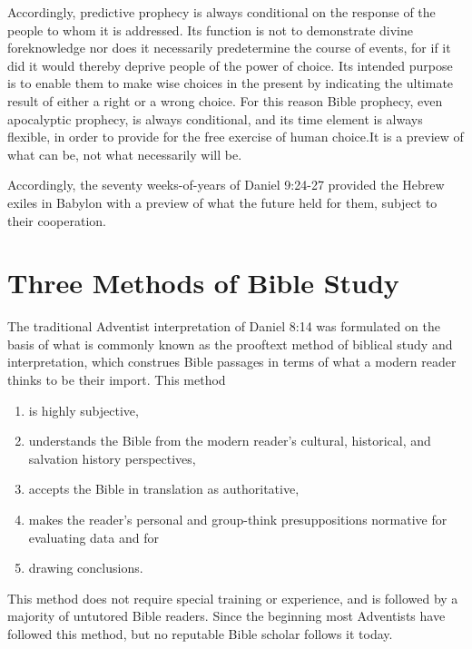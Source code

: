 Accordingly, predictive prophecy is always conditional on the response of
the people to whom it is addressed. Its function is not to demonstrate
divine foreknowledge nor does it necessarily predetermine the course of
events, for if it did it would thereby deprive people of the power of
choice. Its intended purpose is to enable them to make wise choices in the
present by indicating the ultimate result of either a right or a wrong
choice. For this reason Bible prophecy, even apocalyptic prophecy, is always
conditional, and its time element is always flexible, in order to provide
for the free exercise of human choice.It is a preview of what can be, not
what necessarily will be.

Accordingly, the seventy weeks-of-years of Daniel 9:24-27 provided the
Hebrew exiles in Babylon with a preview of what the future held for them, 
subject to their cooperation.

\section{Three Methods of Bible Study}

The traditional Adventist interpretation of Daniel 8:14 was formulated on
the basis of what is commonly known as the prooftext method of biblical
study and interpretation, which construes Bible passages in terms of what a
modern reader thinks to be their import. This method
\begin{enumerate}
    \item is highly
subjective,
    \item understands the Bible from the modern reader's cultural,
historical, and salvation history perspectives,
    \item accepts the Bible in
translation as authoritative,
    \item makes the reader's personal and
group-think presuppositions normative for evaluating data and for
    \item
drawing conclusions.
\end{enumerate}
This method does not require special training or
experience, and is followed by a majority of untutored Bible readers. Since
the beginning most Adventists have followed this method, but no reputable
Bible scholar follows it today. 

